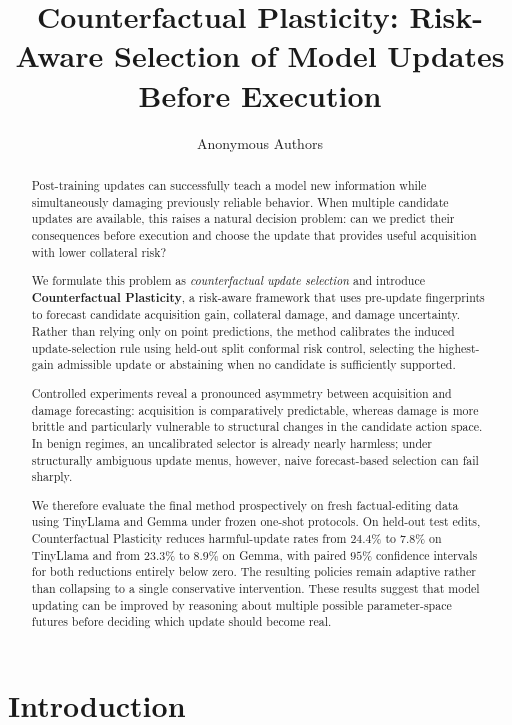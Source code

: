\documentclass{article} %
\title{Counterfactual Plasticity: Risk-Aware Selection of Model Updates Before Execution}
\author{Anonymous Authors}
\begin{document}
\maketitle

\begin{abstract}
Post-training updates can successfully teach a model new information while
simultaneously damaging previously reliable behavior.
When multiple candidate updates are available, this raises a natural decision
problem: can we predict their consequences before execution and choose the
update that provides useful acquisition with lower collateral risk?

We formulate this problem as \emph{counterfactual update selection} and
introduce \textbf{Counterfactual Plasticity}, a risk-aware framework that uses
pre-update fingerprints to forecast candidate acquisition gain, collateral
damage, and damage uncertainty.
Rather than relying only on point predictions, the method calibrates the
induced update-selection rule using held-out split conformal risk control,
selecting the highest-gain admissible update or abstaining when no candidate is
sufficiently supported.

Controlled experiments reveal a pronounced asymmetry between acquisition and
damage forecasting: acquisition is comparatively predictable, whereas damage
is more brittle and particularly vulnerable to structural changes in the
candidate action space.
In benign regimes, an uncalibrated selector is already nearly harmless;
under structurally ambiguous update menus, however, naive forecast-based
selection can fail sharply.

We therefore evaluate the final method prospectively on fresh factual-editing
data using TinyLlama and Gemma under frozen one-shot protocols.
On held-out test edits, Counterfactual Plasticity reduces harmful-update rates
from $24.4\%$ to $7.8\%$ on TinyLlama and from $23.3\%$ to $8.9\%$ on Gemma,
with paired $95\%$ confidence intervals for both reductions entirely below
zero.
The resulting policies remain adaptive rather than collapsing to a single
conservative intervention.
These results suggest that model updating can be improved by reasoning about
multiple possible parameter-space futures before deciding which update should
become real.
\end{abstract}

\section{Introduction}
\label{sec:introduction}
\end{document}
